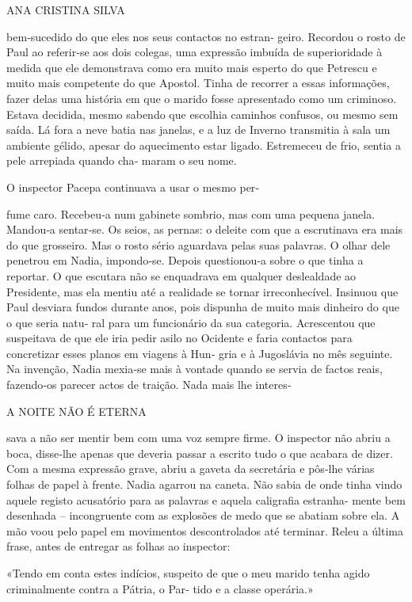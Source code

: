 ANA CRISTINA SILVA

bem‑sucedido do que eles nos seus contactos no estran‑ geiro. Recordou o
rosto de Paul ao referir‑se aos dois colegas, uma expressão imbuída de
superioridade à medida que ele demonstrava como era muito mais esperto
do que Petrescu e muito mais competente do que Apostol. Tinha de
recorrer a essas informações, fazer delas uma história em que o marido
fosse apresentado como um criminoso. Estava decidida, mesmo sabendo que
escolhia caminhos confusos, ou mesmo sem saída. Lá fora a neve batia nas
janelas, e a luz de Inverno transmitia à sala um ambiente gélido, apesar
do aquecimento estar ligado. Estremeceu de frio, sentia a pele arrepiada
quando cha‑ maram o seu nome.

O inspector Pacepa continuava a usar o mesmo per‑

fume caro. Recebeu‑a num gabinete sombrio, mas com uma pequena janela.
Mandou‑a sentar‑se. Os seios, as pernas: o deleite com que a escrutinava
era mais do que grosseiro. Mas o rosto sério aguardava pelas suas
palavras. O olhar dele penetrou em Nadia, impondo‑se. Depois
questionou‑a sobre o que tinha a reportar. O que escutara não se
enquadrava em qualquer deslealdade ao Presidente, mas ela mentiu até a
realidade se tornar irreconhecível. Insinuou que Paul desviara fundos
durante anos, pois dispunha de muito mais dinheiro do que o que seria
natu‑ ral para um funcionário da sua categoria. Acrescentou que
suspeitava de que ele iria pedir asilo no Ocidente e faria contactos
para concretizar esses planos em viagens à Hun‑ gria e à Jugoslávia no
mês seguinte. Na invenção, Nadia mexia‑se mais à vontade quando se
servia de factos reais, fazendo‑os parecer actos de traição. Nada mais
lhe interes‑

A NOITE NÃO É ETERNA

sava a não ser mentir bem com uma voz sempre firme. O inspector não
abriu a boca, disse‑lhe apenas que deveria passar a escrito tudo o que
acabara de dizer. Com a mesma expressão grave, abriu a gaveta da
secretária e pôs‑lhe várias folhas de papel à frente. Nadia agarrou na
caneta. Não sabia de onde tinha vindo aquele registo acusatório para as
palavras e aquela caligrafia estranha‑ mente bem desenhada --
incongruente com as explosões de medo que se abatiam sobre ela. A mão
voou pelo papel em movimentos descontrolados até terminar. Releu a
última frase, antes de entregar as folhas ao inspector:

«Tendo em conta estes indícios, suspeito de que o meu marido tenha agido
criminalmente contra a Pátria, o Par‑ tido e a classe operária.»

